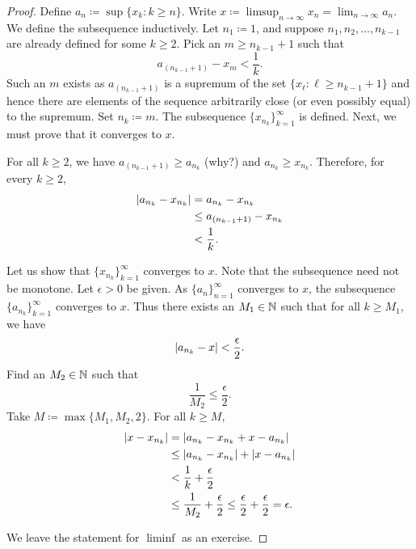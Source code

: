 \begin{proof}
Define $a_n \coloneqq \sup \{ x_k : k \geq n \}$.
Write
$x \coloneqq \limsup_{n\to\infty} x_n = \lim_{n\to\infty} a_n$.
We define the subsequence inductively.
Let $n_1 \coloneqq 1$, and suppose $n_1,n_2,\ldots,n_{k-1}$ are already defined for
some $k \geq 2$.  Pick an $m \geq n_{k-1} + 1$
such that
\begin{equation*}
a_{(n_{k-1}+1)} - x_m < \frac{1}{k} .
\end{equation*}
Such an $m$ exists
as $a_{(n_{k-1}+1)}$ is a supremum of the
set $\{ x_\ell : \ell \geq n_{k-1} + 1 \}$ and hence there are elements
of the sequence arbitrarily close (or even possibly equal) to the supremum.
Set $n_{k} \coloneqq  m$.  The subsequence $\{ x_{n_k} \}_{k=1}^\infty$ is defined.  Next, we
must prove that it converges to $x$.

For all $k \geq 2$, we have
$a_{(n_{k-1}+1)} \geq a_{n_k}$ (why?) and $a_{n_{k}} \geq x_{n_k}$.
Therefore, for every $k \geq 2$,
\begin{equation*}
\begin{split}
\lvert {a_{n_k} - x_{n_k}} \rvert & = 
a_{n_k} - x_{n_k}
\\
& \leq
a_{(n_{k-1}+1)} - x_{n_k}
\\
& < \frac{1}{k} .
\end{split}
\end{equation*}

Let us show that $\{ x_{n_k} \}_{k=1}^\infty$ converges to $x$.
Note that the subsequence need not be monotone.  Let $\epsilon > 0$ be given.
As $\{ a_n \}_{n=1}^\infty$ converges to $x$, the subsequence
$\{ a_{n_k} \}_{k=1}^\infty$ converges to $x$.
Thus there exists an $M_1 \in {\mathbb{N}}$
such that for all $k \geq M_1$, we have
\begin{equation*}
\lvert {a_{n_k} - x} \rvert < \frac{\epsilon}{2} .
\end{equation*}
Find an $M_2 \in {\mathbb{N}}$ such that
\begin{equation*}
\frac{1}{M_2} \leq \frac{\epsilon}{2}.
\end{equation*}
Take $M \coloneqq \max \{M_1 , M_2 , 2 \}$.  For all $k \geq M$,
\begin{equation*}
\begin{split}
\lvert {x- x_{n_k}} \rvert & =
\lvert {a_{n_k} - x_{n_k} + x - a_{n_k}} \rvert
\\
& \leq \lvert {a_{n_k} - x_{n_k}} \rvert + \lvert {x - a_{n_k}} \rvert
\\
& < \frac{1}{k} + \frac{\epsilon}{2}
\\
& \leq \frac{1}{M_2} + \frac{\epsilon}{2} \leq \frac{\epsilon}{2} +
\frac{\epsilon}{2} = \epsilon .
\end{split}
\end{equation*}

We leave the statement for $\liminf$ as an exercise.
\end{proof}

